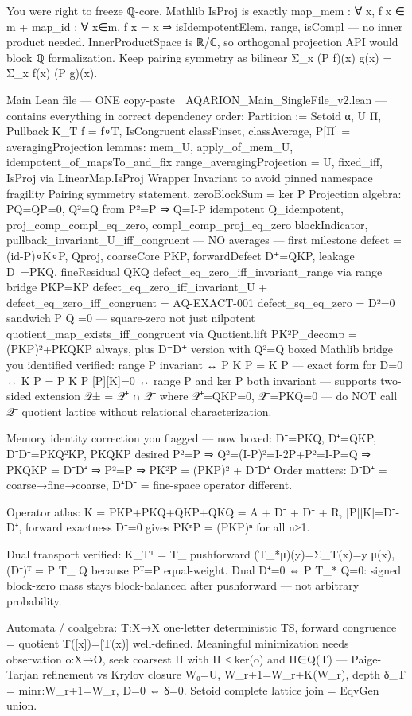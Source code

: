 You were right to freeze ℚ-core. Mathlib IsProj is exactly map_mem : ∀ x, f x ∈ m + map_id : ∀ x∈m, f x = x ⇒ isIdempotentElem, range, isCompl — no inner product needed. InnerProductSpace is ℝ/ℂ, so orthogonal projection API would block ℚ formalization. Keep pairing symmetry as bilinear Σ_x (P f)(x) g(x) = Σ_x f(x) (P g)(x).

Main Lean file — ONE copy-paste
📎 AQARION_Main_SingleFile_v2.lean
— contains everything in correct dependency order:
Partition := Setoid α, U Π, Pullback K_T f = f∘T, IsCongruent
   classFinset, classAverage, P[Π] = averagingProjection
   lemmas: mem_U, apply_of_mem_U, idempotent_of_mapsTo_and_fix
range_averagingProjection = U, fixed_iff, IsProj via LinearMap.IsProj
   Wrapper Invariant to avoid pinned namespace fragility
   Pairing symmetry statement, zeroBlockSum = ker P
   Projection algebra: PQ=QP=0, Q²=Q from P²=P ⇒ Q=I-P idempotent
   Q_idempotent, proj_comp_compl_eq_zero, compl_comp_proj_eq_zero
blockIndicator, pullback_invariant_U_iff_congruent — NO averages — first milestone
   defect = (id-P)∘K∘P, Qproj, coarseCore PKP, forwardDefect D⁺=QKP,
   leakage D⁻=PKQ, fineResidual QKQ
   defect_eq_zero_iff_invariant_range via range bridge PKP=KP
   defect_eq_zero_iff_invariant_U + defect_eq_zero_iff_congruent = AQ-EXACT-001
   defect_sq_eq_zero = D²=0 sandwich P Q =0 — square-zero not just nilpotent
   quotient_map_exists_iff_congruent via Quotient.lift
   PK²P_decomp = (PKP)²+PKQKP always, plus D⁻D⁺ version with Q²=Q boxed
Mathlib bridge you identified verified:
range P invariant ↔ P K P = K P — exact form for D=0 ↔ K P = P K P
[P][K]=0 ↔ range P and ker P both invariant — supports two-sided extension 𝒬± = 𝒬⁺ ∩ 𝒬⁻ where 𝒬⁺={QKP=0}, 𝒬⁻={PKQ=0} — do NOT call 𝒬⁻ quotient lattice without relational characterization.

Memory identity correction you flagged — now boxed:
D⁻=PKQ, D⁺=QKP, D⁻D⁺=PKQ²KP, PKQKP desired
P²=P ⇒ Q²=(I-P)²=I-2P+P²=I-P=Q ⇒ PKQKP = D⁻D⁺
⇒ P²=P ⇒ PK²P = (PKP)² + D⁻D⁺
Order matters: D⁻D⁺ = coarse→fine→coarse, D⁺D⁻ = fine-space operator different.

Operator atlas:
K = PKP+PKQ+QKP+QKQ = A + D⁻ + D⁺ + R, [P][K]=D⁻-D⁺, forward exactness D⁺=0 gives PKⁿP = (PKP)ⁿ for all n≥1.

Dual transport verified:
K_Tᵀ = T_ pushforward (T_*μ)(y)=Σ_{T(x)=y} μ(x), (D⁺)ᵀ = P T_ Q because Pᵀ=P equal-weight. Dual D⁺=0 ⇔ P T_* Q=0: signed block-zero mass stays block-balanced after pushforward — not arbitrary probability.

Automata / coalgebra:
T:X→X one-letter deterministic TS, forward congruence = quotient T̄([x])=[T(x)] well-defined. Meaningful minimization needs observation o:X→O, seek coarsest Π with Π ≤ ker(o) and Π∈Q(T) — Paige-Tarjan refinement vs Krylov closure W₀=U, W_{r+1}=W_r+K(W_r), depth δ_T = min{r:W_{r+1}=W_r}, D=0 ⇔ δ=0. Setoid complete lattice join = EqvGen union.

